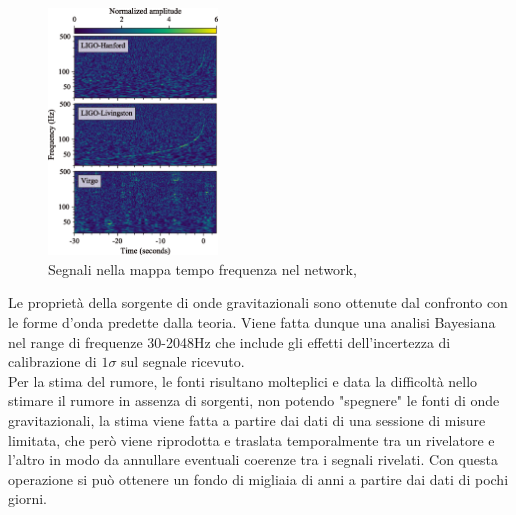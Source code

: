 \begin{figure}
	\vspace{-10pt}
	\begin{center}
		\includegraphics[width=0.4\textwidth]{figures/Capitolo_1/gw170817_time_freq.png}
	\end{center}
	\vspace{-7pt}
	\caption{Segnali nella mappa tempo frequenza nel network, \cite{Abbott_2017a}}
	\label{fig:osservazione_gw170817}
	\vspace{-15pt}
\end{figure}
Le proprietà della sorgente di onde gravitazionali sono ottenute dal confronto con le forme d'onda predette dalla teoria. Viene fatta dunque una analisi Bayesiana nel range di frequenze 30-2048Hz che include gli effetti dell'incertezza di calibrazione di $1\sigma$ sul segnale ricevuto.\\Per la stima del rumore, le fonti risultano molteplici e data la difficoltà nello stimare il rumore in assenza di sorgenti, non potendo "spegnere" le fonti di onde gravitazionali, la stima viene fatta a partire dai dati di una sessione di misure limitata, che però viene riprodotta e traslata temporalmente tra un rivelatore e l'altro in modo da annullare eventuali coerenze tra i segnali rivelati. Con questa operazione si può ottenere un fondo di migliaia di anni a partire dai dati di pochi giorni.


